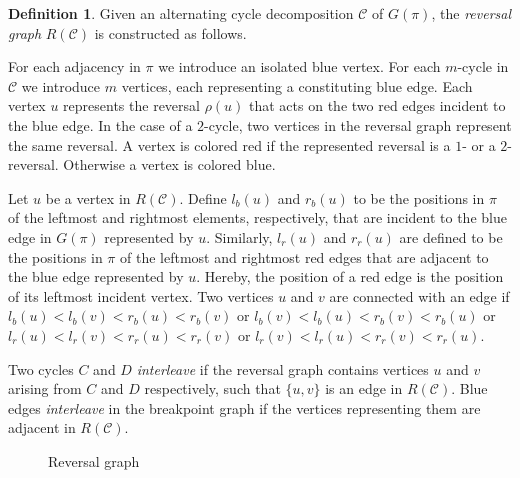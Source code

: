 \documentclass[11pt,DIV=11]{scrartcl}
\theoremstyle{definition}
\newtheorem{definition}[theorem]{Definition}
\theoremstyle{remark}
\begin{document}
\begin{definition}
Given an alternating cycle decomposition $\mathcal{C}$ of $G(\pi)$, the \textit{reversal graph} $R(\mathcal{C})$ is constructed as follows.

For each adjacency in $\pi$ we introduce an isolated blue vertex. For each $m$-cycle in $\mathcal{C}$ we introduce $m$ vertices, each representing a constituting blue edge. Each vertex $u$ represents the reversal $\rho(u)$ that acts on the two red edges incident to the blue edge. In the case of a $2$-cycle, two vertices in the reversal graph represent the same reversal. A vertex is colored red if the represented reversal is a $1$- or a $2$-reversal. Otherwise a vertex is colored blue.

Let $u$ be a vertex in $R(\mathcal{C})$. Define $l_b(u)$ and $r_b(u)$ to be the positions in $\pi$ of the leftmost and rightmost elements, respectively, that are incident to the blue edge in $G(\pi)$ represented by $u$. Similarly, $l_r(u)$ and $r_r(u)$ are defined to be the positions in $\pi$ of the leftmost and rightmost red edges that are adjacent to the blue edge represented by $u$. Hereby, the position of a red edge is the position of its leftmost incident vertex. Two vertices $u$ and $v$ are connected with an edge if $l_b(u) < l_b(v) < r_b(u) < r_b(v)$ or $l_b(v) < l_b(u) < r_b(v) < r_b(u)$ or $l_r(u) < l_r(v) < r_r(u) < r_r(v)$ or $l_r(v) < l_r(u) < r_r(v) < r_r(u)$.

Two cycles $C$ and $D$ \textit{interleave} if the reversal graph contains vertices $u$ and $v$ arising from $C$ and $D$ respectively, such that $\{u,v\}$ is an edge in $R(\mathcal{C})$. Blue edges \textit{interleave} in the breakpoint graph if the vertices representing them are adjacent in $R(\mathcal{C})$.
\end{definition}

\begin{figure}
    \centering
    \caption{Reversal graph}
    \label{fig:reversal_graph}
\end{figure}
\end{document}
